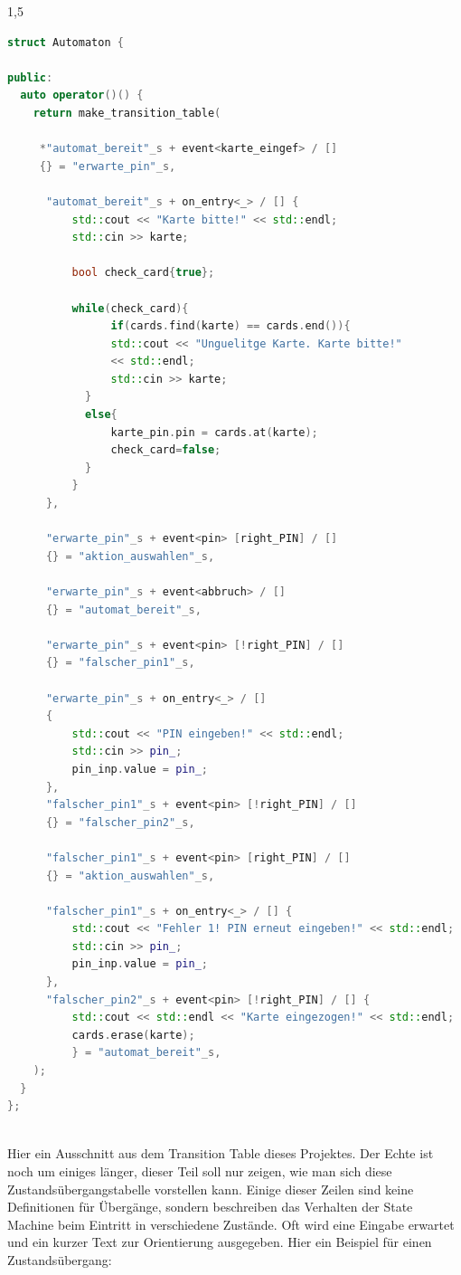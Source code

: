 \documentclass[a4paper]{article}
\begin{document}
\begin{spacing}{1,5}
\begin{lstlisting}[language=c++]
struct Automaton {

public:
  auto operator()() {
    return make_transition_table(
    
     *"automat_bereit"_s + event<karte_eingef> / []
     {} = "erwarte_pin"_s,
     
      "automat_bereit"_s + on_entry<_> / [] {
          std::cout << "Karte bitte!" << std::endl;
          std::cin >> karte;

          bool check_card{true};

          while(check_card){
                if(cards.find(karte) == cards.end()){
                std::cout << "Unguelitge Karte. Karte bitte!"
                << std::endl;
                std::cin >> karte;
            }
            else{
                karte_pin.pin = cards.at(karte);
                check_card=false;
            }
          }      
      },
      
      "erwarte_pin"_s + event<pin> [right_PIN] / []
      {} = "aktion_auswahlen"_s,
      
      "erwarte_pin"_s + event<abbruch> / []
      {} = "automat_bereit"_s,
      
      "erwarte_pin"_s + event<pin> [!right_PIN] / []
      {} = "falscher_pin1"_s,
      
      "erwarte_pin"_s + on_entry<_> / []
      {
          std::cout << "PIN eingeben!" << std::endl; 
          std::cin >> pin_;
          pin_inp.value = pin_;        
      },
      "falscher_pin1"_s + event<pin> [!right_PIN] / []
      {} = "falscher_pin2"_s,
      
      "falscher_pin1"_s + event<pin> [right_PIN] / []
      {} = "aktion_auswahlen"_s,
      
      "falscher_pin1"_s + on_entry<_> / [] {
          std::cout << "Fehler 1! PIN erneut eingeben!" << std::endl;
          std::cin >> pin_;
          pin_inp.value = pin_;
      },
      "falscher_pin2"_s + event<pin> [!right_PIN] / [] {
          std::cout << std::endl << "Karte eingezogen!" << std::endl;
          cards.erase(karte);
          } = "automat_bereit"_s,
    );
  }
};
	
\end{lstlisting}
Hier ein Ausschnitt aus dem Transition Table dieses Projektes. Der Echte ist noch um einiges länger, dieser Teil soll nur zeigen, wie man sich diese Zustandsübergangstabelle vorstellen kann. Einige dieser Zeilen sind keine Definitionen für Übergänge, sondern beschreiben das Verhalten der State Machine beim Eintritt in verschiedene Zustände. Oft wird eine Eingabe erwartet und ein kurzer Text zur Orientierung ausgegeben.\newline\newline
Hier ein Beispiel für einen Zustandsübergang:


\end{spacing}
\end{document}
